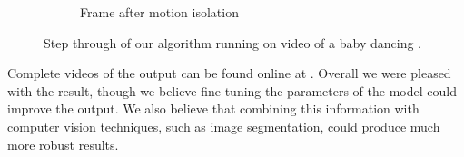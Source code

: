 \begin{figure}[tb]
\begin{subfigure}[b]{0.33\textwidth}
		\caption{Frame after motion isolation}
	\end{subfigure}%

	\caption{Step through of our algorithm running on video of a baby dancing \cite{bimbodance}.}
	\label{fig:bimbodance}
\end{figure}

Complete videos of the output can be found online at .
Overall we were pleased with the result, though we believe fine-tuning the
parameters of the model could improve the output.  We also believe that
combining this information with computer vision techniques, such as image
segmentation, could produce much more robust results.







